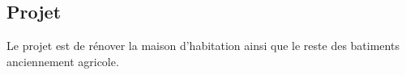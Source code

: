 \subsection{Projet}

Le projet est de rénover la maison d'habitation ainsi que le reste des batiments anciennement agricole.
